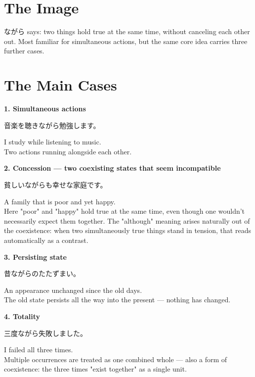 \documentclass[12pt]{book}
\begin{document}
\section*{The Image}

ながら says: two things hold true at the same time, without canceling each other out. Most familiar for simultaneous actions, but the same core idea carries three further cases.

\section*{The Main Cases}

\textbf{1. Simultaneous actions}
\par\quad 音楽を聴きながら勉強します。\\
\par\quad I study while listening to music.\\

Two actions running alongside each other.

\textbf{2. Concession — two coexisting states that seem incompatible}
\par\quad 貧しいながらも幸せな家庭です。\\
\par\quad A family that is poor and yet happy.\\

Here "poor" and "happy" hold true at the same time, even though one wouldn't necessarily expect them together. The "although" meaning arises naturally out of the coexistence: when two simultaneously true things stand in tension, that reads automatically as a contrast.

\textbf{3. Persisting state}
\par\quad 昔ながらのたたずまい。\\
\par\quad An appearance unchanged since the old days.\\

The old state persists all the way into the present — nothing has changed.

\textbf{4. Totality}
\par\quad 三度ながら失敗しました。\\
\par\quad I failed all three times.\\

Multiple occurrences are treated as one combined whole — also a form of coexistence: the three times "exist together" as a single unit.
\end{document}

